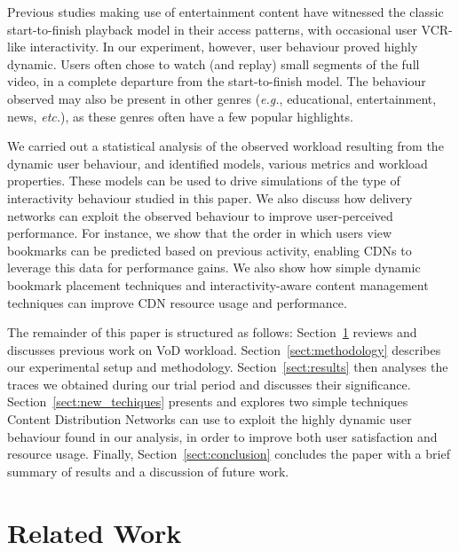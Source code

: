 \documentclass[a4paper,11pt]{article}
\begin{document}
Previous studies making use of entertainment content have witnessed
the classic start-to-finish playback model in their access patterns,
with occasional user VCR-like interactivity. In our experiment,
however, user behaviour proved highly dynamic. Users often chose to watch
(and replay) small segments of the full video, in a complete
departure from the start-to-finish model. The behaviour observed may
also be present in other genres (\emph{e.g.}, educational,
entertainment, news, \emph{etc.}), as these genres often have a few
popular highlights.

We carried out a statistical analysis of the observed workload
resulting from the dynamic user behaviour, and identified models,
various metrics and workload properties. These models can be used to
drive simulations of the type of interactivity behaviour studied in
this paper. We also discuss how delivery networks can exploit the
observed behaviour to improve user-perceived performance. For
instance, we show that the order in which users view bookmarks can be
predicted based on previous activity, enabling CDNs to leverage this
data for performance gains. We also show how simple dynamic
bookmark placement techniques and interactivity-aware content
management techniques can improve CDN resource usage and performance.


The remainder of this paper is structured as follows:
Section~\ref{sect:related-work} reviews and discusses previous work on
VoD workload. Section~\ref{sect:methodology} describes our
experimental setup and methodology. Section~\ref{sect:results} then analyses the
traces we obtained during our trial period and discusses their
significance. Section~\ref{sect:new_techiques} presents and explores
two simple techniques Content Distribution Networks can use to exploit
the highly dynamic user behaviour found in our analysis, in order to
improve both user satisfaction and resource usage. Finally,
Section~\ref{sect:conclusion} concludes the paper with a brief summary of
results and a discussion of future work.

\section{Related Work}
\label{sect:related-work}
\end{document}
